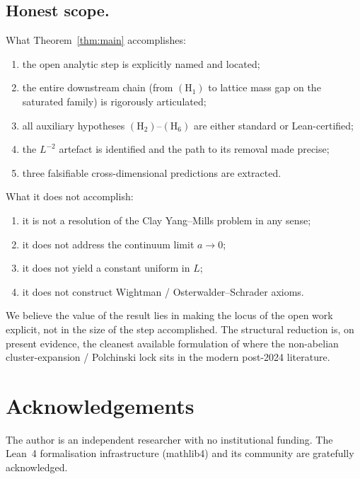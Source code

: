 \documentclass[11pt,reqno]{amsart}
\theoremstyle{plain}
\theoremstyle{definition}
\theoremstyle{remark}
\begin{document}
\subsection{Honest scope.}
What Theorem~\ref{thm:main} accomplishes:
\begin{enumerate}[leftmargin=*]
  \item the open analytic step is explicitly named and located;
  \item the entire downstream chain (from $(\mathrm{H}_1)$ to lattice mass gap on the saturated family) is rigorously articulated;
  \item all auxiliary hypotheses $(\mathrm{H}_2)$--$(\mathrm{H}_6)$ are either standard or Lean-certified;
  \item the $L^{-2}$ artefact is identified and the path to its removal made precise;
  \item three falsifiable cross-dimensional predictions are extracted.
\end{enumerate}
What it does not accomplish:
\begin{enumerate}[leftmargin=*]
  \item it is not a resolution of the Clay Yang--Mills problem in any sense;
  \item it does not address the continuum limit $a \to 0$;
  \item it does not yield a constant uniform in $L$;
  \item it does not construct Wightman / Osterwalder--Schrader axioms.
\end{enumerate}
We believe the value of the result lies in making the locus of the open work explicit, not in the size of the step accomplished. The structural reduction is, on present evidence, the cleanest available formulation of where the non-abelian cluster-expansion / Polchinski lock sits in the modern post-2024 literature.

\section*{Acknowledgements}

The author is an independent researcher with no institutional funding. The Lean~4 formalisation infrastructure (mathlib4) and its community are gratefully acknowledged.
\end{document}

